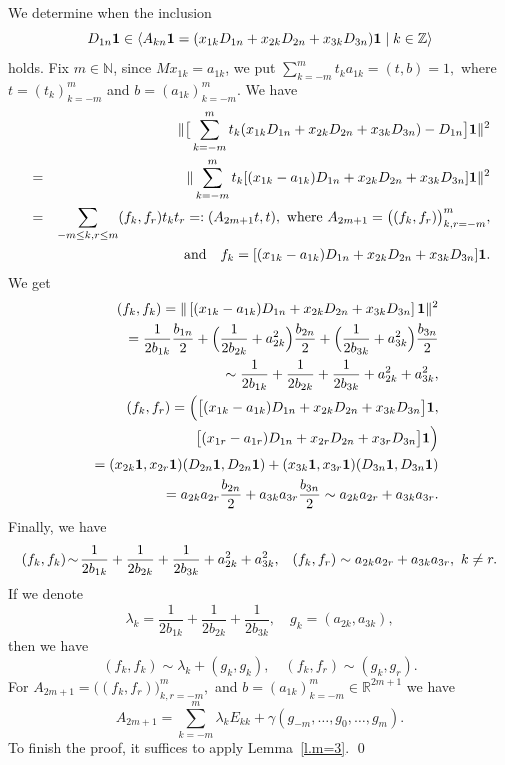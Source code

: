 \documentclass[preprint,12pt]{elsarticle}
\numberwithin{equation}{section}
\begin{document}
\begin{pf} 
We determine when the inclusion
$$
D_{1n}{\bf 1}\in\langle A_{kn}{\bf
1}=(x_{1k}D_{1n}+x_{2k}D_{2n}+x_{3k}D_{3n}){\bf 1}\mid k\in {\mathbb Z}\rangle
$$
holds. Fix $m\in {\mathbb N}$, since $Mx_{1k}=a_{1k}$, we put 
$
\sum_{k=-m}^mt_ka_{1k}=(t,b)=1,
$
where $t=(t_k)_{k=-m}^m$ and $b=(a_{1k})_{k=-m}^m$. We have
\begin{eqnarray*}
 &&
\Vert \big[\sum_{k=-m}^mt_k(x_{1k}D_{1n}+x_{2k}D_{2n}+x_{3k}D_{3n})-D_{1n}\big]{\bf
1}\Vert^2\\
&=&
\Vert \sum_{k=-m}^mt_k[(x_{1k}-a_{1k})D_{1n}+x_{2k}D_{2n}+x_{3k}D_{3n}]{\bf
1}\Vert^2\\
&=&\sum_{-m\leq k,r\leq m}(f_k,f_r)t_kt_r=:(A_{2m+1}t,t),\,\,\text{where}\,\, A_{2m+1}=\big((f_k,f_r)\big)_{k,r=-m}^m,\\
&&\quad\text{ and}\quad
f_k=[(x_{1k}-a_{1k})D_{1n}+x_{2k}D_{2n}+x_{3k}D_{3n}]{\bf 1}.
\end{eqnarray*}  
We get
\begin{eqnarray*}
&&(f_k,f_k)=\Vert\left[(x_{1k}-a_{1k})D_{1n}+x_{2k}D_{2n}+x_{3k}D_{3n}\right]{\bf
1}\Vert^2\\
&&=\frac{1}{2b_{1k}}\frac{b_{1n}}{2}+\Big(\frac{1}{2b_{2k}}+a_{2k}^2\Big)
\frac{b_{2n}}{2} +\Big(\frac{1}{2b_{3k}}+a_{3k}^2\Big)
\frac{b_{3n}}{2} \\
&&\sim
\frac{1}{2b_{1k}}+\frac{1}{2b_{2k}}+\frac{1}{2b_{3k}}+a_{2k}^2+a_{3k}^2,\\
&&(f_k,f_r)=\Big(\big[(x_{1k}-a_{1k})D_{1n}+x_{2k}D_{2n}+x_{3k}D_{3n}\big]{\bf 1},\\
&&\big[(x_{1r}-a_{1r})D_{1n}+x_{2r}D_{2n}+x_{3r}D_{3n}\big]{\bf 1}\Big) \\
&&=(x_{2k}{\bf 1},x_{2r}{\bf 1})(D_{2n}{\bf 1},D_{2n}{\bf 1})+
(x_{3k}{\bf 1},x_{3r}{\bf 1})(D_{3n}{\bf 1},D_{3n}{\bf 1})\\
&&=a_{2k}a_{2r}\frac{b_{2n}}{2}+a_{3k}a_{3r}\frac{b_{3n}}{2}\sim a_{2k}a_{2r}+a_{3k}a_{3r}.
\end{eqnarray*}
Finally, we have
\begin{equation}
\label{(A_{r,s}),D1,m=3}
(f_k,f_k)\!\sim\!
\frac{1}{2b_{1k}}+\frac{1}{2b_{2k}}+\frac{1}{2b_{3k}}+a_{2k}^2+a_{3k}^2,\,\,\,\,\,
(f_k,f_r)\sim a_{2k}a_{2r}+a_{3k}a_{3r},\,\, k\not=r.
\end{equation}
If we denote
\begin{equation}
\lambda_k=\frac{1}{2b_{1k}}+\frac{1}{2b_{2k}}+\frac{1}{2b_{3k}},\quad g_k=(a_{2k},a_{3k}),
\end{equation}
then we have
\begin{equation}
(f_k,f_k)\sim \lambda_k+(g_k,g_k),\quad (f_k,f_r)\sim (g_k,g_r).
\end{equation}
%
For $A_{2m+1}=\big((f_k,f_r)\big)_{k,r=-m}^m,$ and
$b=(a_{1k})_{k=-m}^m\in {\mathbb R}^{2m+1}$ we have
$$
A_{2m+1}= \sum_{k=-m}^m\lambda_kE_{kk}+\gamma(g_{-m},\dots,g_0,\dots,g_m).
$$
To finish the proof, it  suffices to apply  Lemma~\ref{l.m=3}.
 \qed\end{pf}
\end{document}
